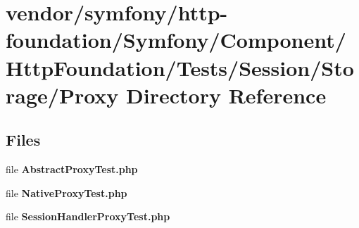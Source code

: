 \section{vendor/symfony/http-\/foundation/\+Symfony/\+Component/\+Http\+Foundation/\+Tests/\+Session/\+Storage/\+Proxy Directory Reference}
\label{dir_ed9300902e436402696698141a50f2d6}
\subsection*{Files}
\begin{DoxyCompactItemize}
\item 
file {\bf Abstract\+Proxy\+Test.\+php}
\item 
file {\bf Native\+Proxy\+Test.\+php}
\item 
file {\bf Session\+Handler\+Proxy\+Test.\+php}
\end{DoxyCompactItemize}
